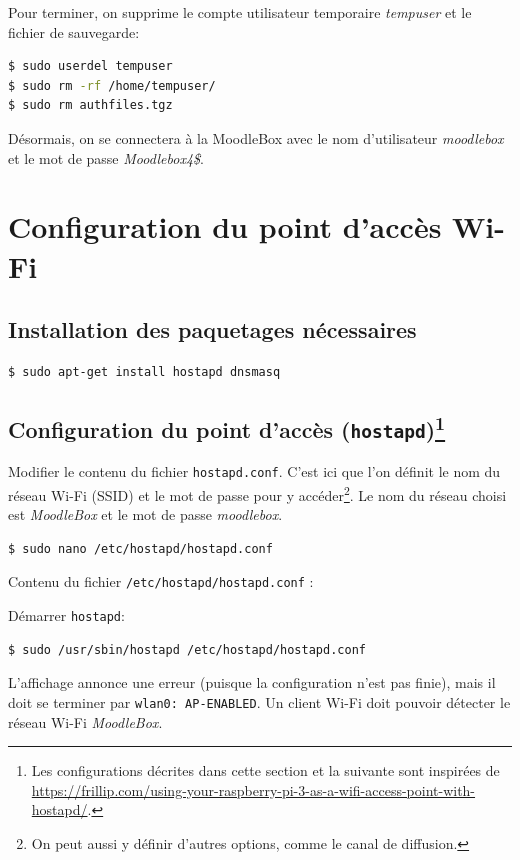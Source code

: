 \documentclass[11pt]{article}
\begin{document}
Pour terminer, on supprime le compte utilisateur temporaire \emph{tempuser} et le fichier de sauvegarde:
\begin{lstlisting}[language=bash]
$ sudo userdel tempuser
$ sudo rm -rf /home/tempuser/
$ sudo rm authfiles.tgz
\end{lstlisting}

Désormais, on se connectera à la MoodleBox avec le nom d'utilisateur \emph{moodlebox} et le mot de passe \emph{Moodlebox4\$}.

\section{Configuration du point d'accès Wi-Fi}

\subsection{Installation des paquetages nécessaires}

\begin{lstlisting}[language=bash]
$ sudo apt-get install hostapd dnsmasq
\end{lstlisting}

\subsection[Configuration du point d'accès (\lstinline{hostapd})]{Configuration du point d'accès (\lstinline{hostapd})\footnote{Les configurations décrites dans cette section et la suivante sont inspirées de \url{https://frillip.com/using-your-raspberry-pi-3-as-a-wifi-access-point-with-hostapd/}.}}

Modifier le contenu du fichier \lstinline{hostapd.conf}. C'est ici que l'on définit le nom du réseau Wi-Fi (SSID) et le mot de passe pour y accéder\footnote{On peut aussi y définir d'autres options, comme le canal de diffusion.}. Le nom du réseau choisi est \emph{MoodleBox} et le mot de passe \emph{moodlebox}.

\begin{lstlisting}[language=bash]
$ sudo nano /etc/hostapd/hostapd.conf
\end{lstlisting}

Contenu du fichier \lstinline{/etc/hostapd/hostapd.conf} :



\begin{verification}
Démarrer \lstinline{hostapd}:
\begin{lstlisting}[language=bash]
$ sudo /usr/sbin/hostapd /etc/hostapd/hostapd.conf
\end{lstlisting}

L'affichage annonce une erreur (puisque la configuration n'est pas finie), mais il doit se terminer par \lstinline{wlan0: AP-ENABLED}. Un client Wi-Fi doit pouvoir détecter le réseau Wi-Fi \emph{MoodleBox}.
\end{verification}
\end{document}
